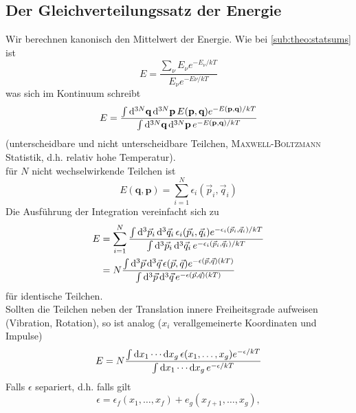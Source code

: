 \subsection{Der Gleichverteilungssatz der Energie}
Wir berechnen kanonisch den Mittelwert der Energie. Wie bei \ref{sub:theo:statsums} ist
\begin{equation}
    E = \frac{\sum_\nu E_\nu e^{- E_\nu / kT}}{E_\nu e^{-E\nu / kT}}
\end{equation}
was sich im Kontinuum schreibt
\begin{equation}
    E = \frac{\int \mathrm{d}^{3N} \textbf{q} \, \mathrm{d}^{3N} \textbf{p} \, E(\textbf{p}, \textbf{q}) e^{-E(\textbf{p}, \textbf{q})/kT}}{\int \mathrm{d}^{3N} \textbf{q} \, \mathrm{d}^{3N} \textbf{p} \, e^{-E(\textbf{p}, \textbf{q})/kT}}
\end{equation}
(unterscheidbare und nicht unterscheidbare Teilchen, \textsc{Maxwell-Boltzmann} Statistik, d.h. relativ hohe Temperatur). \\
für $N$ nicht wechselwirkende Teilchen ist
\begin{equation}
    E(\textbf{q}, \textbf{p}) = \sum_{i=1}^{N} \epsilon_i(\vec{p}_i, \vec{q}_i)
\end{equation}
Die Ausführung der Integration vereinfacht sich zu
\begin{equation}
    \begin{split}
        E &= \sum_{i=1}^{N} \frac{\int \mathrm{d}^3 \vec{p}_i \, \mathrm{d}^3 \vec{q}_i \, \epsilon_i(\vec{p}_i, \vec{q}_i) e^{- \epsilon_i(\vec{p}_i, \vec{q}_i) / kT}}{\int \mathrm{d}^3 \vec{p}_i \, \mathrm{d}^3 \vec{q}_i \, e^{- \epsilon_i(\vec{p}_i, \vec{q}_i) / kT}} \\
        &= N \frac{\int \mathrm{d}^3 \vec{p} \, \mathrm{d}^3 \vec{q} \, \epsilon(\vec{p}, \vec{q}) e^{- \epsilon(\vec{p}, \vec{q})(kT)}}{\int \mathrm{d}^3 \vec{p} \, \mathrm{d}^3 \vec{q} \, e^{- \epsilon(\vec{p}, \vec{q})(kT)}}
    \end{split}
\end{equation}
für identische Teilchen. \\
Sollten die Teilchen neben der Translation innere Freiheitsgrade aufweisen (Vibration, Rotation), so ist analog ($x_i$ verallgemeinerte Koordinaten und Impulse)
\begin{equation}
    E = N \frac{\int \mathrm{d} x_1 \cdots \mathrm{d} x_g \, \epsilon(x_1, \ldots, x_g) e^{- \epsilon / kT}}{\int \mathrm{d} x_1 \cdots \mathrm{d} x_g \, e^{- \epsilon / kT}}
\end{equation}
Falls $\epsilon$ separiert, d.h. falls gilt
\begin{equation}
    \epsilon = \epsilon_f(x_1, \ldots, x_f) + e_g(x_{f+1}, \ldots, x_g),
\end{equation}
